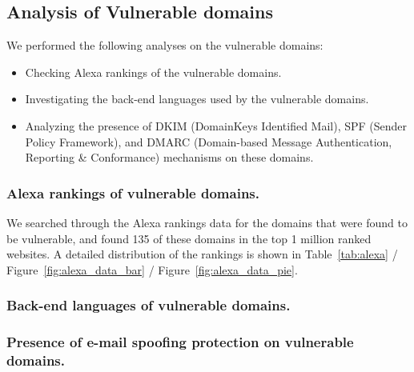 \subsection{Analysis of Vulnerable domains}

We performed the following analyses on the vulnerable domains:
\begin{itemize}
	\item Checking Alexa rankings of the vulnerable domains.
	\item Investigating the back-end languages used by the vulnerable domains.
	\item Analyzing the presence of DKIM (DomainKeys Identified Mail), SPF (Sender Policy Framework), and DMARC (Domain-based Message Authentication, Reporting \& Conformance) mechanisms on these domains.
\end{itemize}


\subsubsection{Alexa rankings of vulnerable domains.}
We searched through the Alexa rankings data\cite{alexa} for the domains that were found to be vulnerable, and found 135 of these domains in the top 1 million ranked websites. A detailed distribution of the rankings is shown in Table~\ref{tab:alexa} / Figure~\ref{fig:alexa_data_bar} / Figure~\ref{fig:alexa_data_pie}.



\subsubsection{Back-end languages of vulnerable domains.}
\subsubsection{Presence of e-mail spoofing protection on vulnerable domains.}